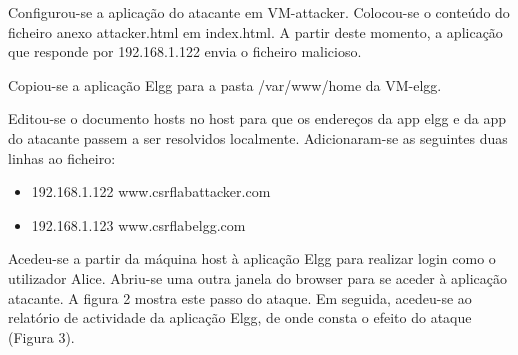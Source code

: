 \documentclass[11pt]{report}
\begin{document}
	Configurou-se a aplicação do atacante em VM-attacker. Colocou-se o conteúdo do ficheiro anexo attacker.html em index.html. A partir deste momento, a aplicação que responde por 192.168.1.122 envia o ficheiro malicioso.
	
	Copiou-se a aplicação Elgg para a pasta /var/www/home da VM-elgg.
	
	Editou-se o documento hosts no host para que os endereços da app elgg e da app do atacante passem a ser resolvidos localmente. Adicionaram-se as seguintes duas linhas ao ficheiro:
	\begin{itemize}
		\item 192.168.1.122 www.csrflabattacker.com
		\item 192.168.1.123 www.csrflabelgg.com
	\end{itemize}
	Acedeu-se a partir da máquina host à aplicação Elgg para realizar login como o utilizador Alice. Abriu-se uma outra janela do browser para se aceder à aplicação atacante. A figura 2 mostra este passo do ataque. Em seguida, acedeu-se ao relatório de actividade da aplicação Elgg, de onde consta o efeito do ataque (Figura 3).
	
\end{document}
